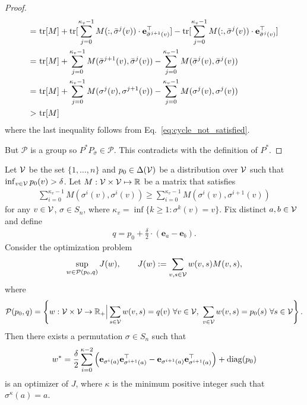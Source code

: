 \begin{proof}
\begin{align*}
    = &~ \mathrm{tr}[M] + \mathrm{tr}[\sum_{j=0}^{\kappa_v-1} M(:,\bar \sigma^j(v)) \cdot \mathbf{e}_{\bar \sigma^{j+1}(v)}^\top ] - \mathrm{tr}[\sum_{j=0}^{\kappa_v-1} M(:,\bar \sigma^j(v)) \cdot \mathbf{e}_{\bar \sigma^j(v)}^\top ]\\
    = &~ \mathrm{tr}[M] + \sum_{j=0}^{\kappa_v-1} M(\bar \sigma^{j+1}(v), \bar \sigma^j(v)) - \sum_{j=0}^{\kappa_v-1}  M(\bar \sigma^j(v),\bar \sigma^j(v))\\
    = &~ \mathrm{tr}[M] + \sum_{j=0}^{\kappa_v-1} M(\sigma^{j}(v), \sigma^{j+1}(v)) - \sum_{j=0}^{\kappa_v-1}  M(\sigma^j(v),\sigma^j(v))\\
    > &~ \mathrm{tr}[M]
\end{align*}
where the last inequality follows from Eq.~\eqref{eq:cycle_not_satisfied}.

But $\mathcal{P}$ is a group so $P^* P_{\bar \sigma} \in \mathcal{P}$. This contradicts with the definition of $P^*$.
\end{proof}

\begin{lemma}\label{lem:inner}
Let $\mathcal{V}$ be the set $\{1,\dots,n\}$ and $p_0 \in \Delta(\mathcal{V})$ be a distribution over $\mathcal{V}$ such that $\inf_{v \in \mathcal{V}}p_0(v) > \delta$.  
Let $M: \mathcal{V} \times \mathcal{V} \mapsto \mathbb{R}$ be a matrix that satisfies
\begin{align}
    \sum_{i=0}^{\kappa_v-1} M(\sigma^i(v),\sigma^i(v)) 
     \geq  \sum_{i=0}^{\kappa_v-1} M(\sigma^i(v),\sigma^{i+1}(v))
    \label{eq:M-cycle-cond}
\end{align}
for any $v \in \mathcal{V}$, $\sigma \in S_n$, where $\kappa_v = \inf\{k\ge1:\sigma^{k}(v) = v\}$. 
Fix distinct $a,b\in\mathcal{V}$ and define
\begin{align*}
    q = p_0 + \frac{\delta}{2}\cdot (\mathbf{e}_a - \mathbf{e}_b).
\end{align*}
Consider the optimization problem
\begin{align*}
    \sup_{w \in \mathcal{P}(p_0,q)} J(w), 
    \qquad 
    J(w) := \sum_{v,s \in \mathcal{V}} w(v,s)   M(v,s),
\end{align*}
where
\begin{align*}
    \mathcal{P}(p_0,q) 
    = \left\{w:\mathcal{V}\times\mathcal{V}\to\mathbb{R}_+  \Big|  
        \sum_{s\in\mathcal{V}} w(v,s) = q(v) \ \forall v\in\mathcal{V},~\sum_{v\in\mathcal{V}} w(v,s) = p_0(s) \ \forall s\in\mathcal{V}
      \right\}.
\end{align*}
Then there exists a permutation $\sigma \in S_n$ such that 
\begin{align}
    w^* 
    = \frac{\delta}{2} \sum_{i=0}^{\kappa-2} 
        \left(\mathbf{e}_{\sigma^{i}(a)}\mathbf{e}_{\sigma^{i+1}(a)}^\top 
              - \mathbf{e}_{\sigma^{i+1}(a)}\mathbf{e}_{\sigma^{i+1}(a)}^\top\right) 
      + \mathrm{diag}(p_0)
      \label{eq:p-star-form}
\end{align}
is an optimizer of $J$, where $\kappa$ is the minimum positive integer such that $\sigma^{\kappa}(a) = a$.
\end{lemma}

